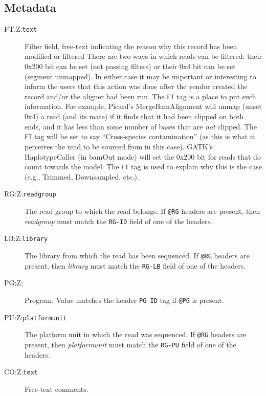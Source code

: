 \documentclass[10pt]{article}
\newcommand{\tagvalue}[1]{\tt #1}
\begin{document}
\subsection{Metadata}

\begin{description}

\item[FT:Z:\tagvalue{text}] Filter field, free-text indicating the reason why this record has been modified or filtered
There are two ways in which reads can be filtered: their 0x200 bit can be set (not passing filters) or their 0x4 bit can be set (segment unmapped). 
In either case it may be important or interesting to inform the users that this action was done after the vendor created the record and/or the aligner had been run. 
The {\tt FT} tag is a place to put such information. 
For example, Picard's MergeBamAlignment will unmap (unset 0x4) a read (and its mate) if it finds that it had been clipped on both ends, and it has less than some number of bases that are \emph{not} clipped.
The {\tt FT} tag will be set to say ``Cross-species contamination'' (as this is what it perceives the read to be sourced from in this case). 
GATK's HaplotypeCaller (in bamOut mode)  will set the 0x200 bit for reads that do count towards the model.  
The {\tt FT} tag is used to explain why this is the case (e.g., Trimmed, Downsampled, etc.). 

\item[RG:Z:\tagvalue{readgroup}]
The read group to which the read belongs.
If {\tt @RG} headers are present, then \emph{readgroup} must match the
{\tt RG-ID} field of one of the headers.

\item[LB:Z:\tagvalue{library}]
The library from which the read has been sequenced.
If {\tt @RG} headers are present, then \emph{library} must match the
{\tt RG-LB} field of one of the headers.

\item[PG:Z:\tagvalue{}]
Program. Value matches the header {\tt PG-ID} tag if {\tt @PG} is present.

\item[PU:Z:\tagvalue{platformunit}]
The platform unit in which the read was sequenced.
If {\tt @RG} headers are present, then \emph{platformunit} must match the
{\tt RG-PU} field of one of the headers.

\item[CO:Z:\tagvalue{text}]
Free-text comments.
\end{description}
\end{document}
